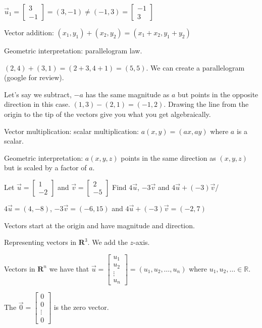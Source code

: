 \documentclass[../linalg.tex]{subfiles}
\begin{document}
$\vec{u}_1=\begin{bmatrix}
    3\\-1
\end{bmatrix}=(3,-1)\neq (-1,3)=\begin{bmatrix}
    -1\\3
\end{bmatrix}$

Vector addition: $(x_1,y_1)+(x_2,y_2)=(x_1+x_2,y_1+y_2)$

Geometric interpretation: parallelogram law.

$(2,4)+(3,1)=(2+3,4+1)=(5,5)$. We can create a parallelogram (google for review).

Let's say we subtract, $-a$ has the same magnitude as $a$ but points in the opposite direction in this case. $(1,3)-(2,1)=(-1,2)$. Drawing the line from the origin to the tip of the vectors give you what you get algebraically.

Vector multiplication: scalar multiplication: $a(x,y)=(ax,ay)$ where $a$ is a scalar.

Geometric interpretation: $a(x,y,z)$ points in the same direction as $(x,y,z)$ but is scaled by a factor of $a$.

\begin{example}
    Let $\vec{u}=\begin{bmatrix}
        1\\ -2
    \end{bmatrix}$ and $\vec{v} = \begin{bmatrix}
        2\\-5
    \end{bmatrix}$ Find $4\vec{u}$, $-3\vec{v}$ and $4\vec{u}+(-3)\vec{v}$/

    $4\vec{u}=(4,-8)$, $-3\vec{v}=(-6,15)$ and $4\vec{u}+(-3)\vec{v}=(-2,7)$
\end{example}

Vectors start at the origin and have magnitude and direction.

Representing vectors in $\textbf{R}^3$. We add the $z$-axis.

Vectors in $\textbf{R}^n$ we have that $\vec{u}=\begin{bmatrix}
    u_1\\ u_2 \\ \vdots \\u_n 
\end{bmatrix}=(u_1,u_2,\dots,u_n)$ where $u_1,u_2,\dots \in \mathbb{R}$.

The $\vec{0}=\begin{bmatrix}
    0\\0\\ \vdots\\0
\end{bmatrix}$ is the zero vector.
\end{document}
